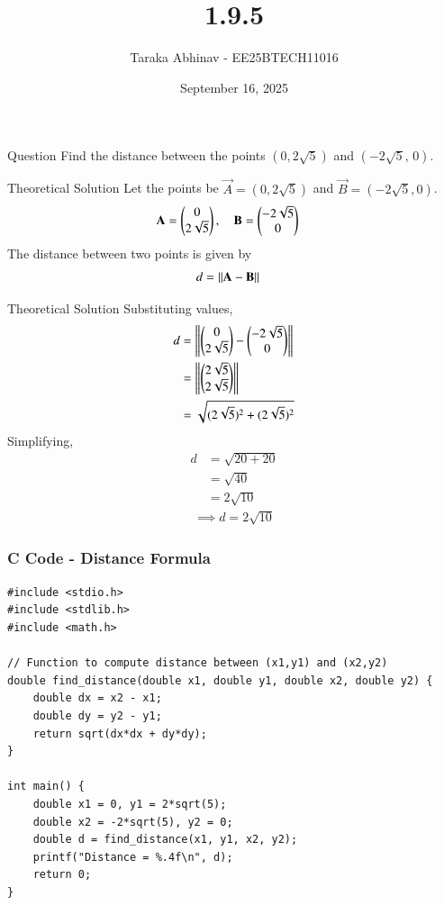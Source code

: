 \documentclass{beamer}
\title %
{1.9.5}
\date{September 16, 2025}
\author %
{Taraka Abhinav - EE25BTECH11016}
\begin{document}
\frame{\titlepage}

\begin{frame}{Question}
Find the distance between the points $(0,2\sqrt{5})$ and $(-2\sqrt{5},\,0)$.
\end{frame}

\begin{frame}{Theoretical Solution}
Let the points be $\vec{A} = (0,2\sqrt{5})$ and $\vec{B} = (-2\sqrt{5},0)$.
\begin{align}
\mathbf{A} &= \begin{pmatrix}0\\2\sqrt{5}\end{pmatrix}, \quad 
\mathbf{B} = \begin{pmatrix}-2\sqrt{5}\\0\end{pmatrix}
\end{align}
The distance between two points is given by
\begin{align}
d &= \left\lVert\mathbf{A}-\mathbf{B}\right\rVert
\end{align}
\end{frame}

\begin{frame}{Theoretical Solution}
Substituting values,
\begin{align}
d &= \left\lVert\begin{pmatrix}0\\2\sqrt{5}\end{pmatrix}-\begin{pmatrix}-2\sqrt{5}\\0\end{pmatrix}\right\rVert \\ 
  &= \left\lVert\begin{pmatrix}2\sqrt{5}\\2\sqrt{5}\end{pmatrix}\right\rVert \\ 
  &= \sqrt{(2\sqrt{5})^2 + (2\sqrt{5})^2}
\end{align}
Simplifying,
\begin{align}
d &= \sqrt{20 + 20} \\
  &= \sqrt{40} \\
  &= 2\sqrt{10}
\end{align}
\begin{align}
\implies d = \boxed{2\sqrt{10}}
\end{align}
\end{frame}


\begin{frame}[fragile]
    \frametitle{C Code - Distance Formula}
    \begin{lstlisting}
#include <stdio.h>
#include <stdlib.h>
#include <math.h>

// Function to compute distance between (x1,y1) and (x2,y2)
double find_distance(double x1, double y1, double x2, double y2) {
    double dx = x2 - x1;
    double dy = y2 - y1;
    return sqrt(dx*dx + dy*dy);
}

int main() {
    double x1 = 0, y1 = 2*sqrt(5);
    double x2 = -2*sqrt(5), y2 = 0;
    double d = find_distance(x1, y1, x2, y2);
    printf("Distance = %.4f\n", d);
    return 0;
}
    \end{lstlisting}
\end{frame}
\end{document}

